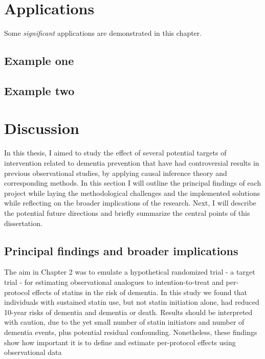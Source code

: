 \documentclass[
]{book}
\begin{document}
\hypertarget{chapter4}{%
\chapter{Applications}\label{chapter4}}

Some \emph{significant} applications are demonstrated in this chapter.

\hypertarget{example-one}{%
\section{Example one}\label{example-one}}

\hypertarget{example-two}{%
\section{Example two}\label{example-two}}

\hypertarget{discussion-1}{%
\chapter{Discussion}\label{discussion-1}}

In this thesis, I aimed to study the effect of several potential targets of intervention related to dementia prevention that have had controversial results in previous observational studies, by applying causal inference theory and corresponding methods. In this section I will outline the principal findings of each project while laying the methodological challenges and the implemented solutions while reflecting on the broader implications of the research. Next, I will describe the potential future directions and briefly summarize the central points of this dissertation.

\hypertarget{principal-findings-and-broader-implications}{%
\section{Principal findings and broader implications}\label{principal-findings-and-broader-implications}}

The aim in Chapter 2 was to emulate a hypothetical randomized trial - a target trial - for estimating observational analogues to intention-to-treat and per-protocol effects of statins in the risk of dementia. In this study we found that individuals with sustained statin use, but not statin initiation alone, had reduced 10-year risks of dementia and dementia or death. Results should be interpreted with caution, due to the yet small number of statin initiators and number of dementia events, plus potential residual confounding. Nonetheless, these findings show how important it is to define and estimate per-protocol effects using observational data
\end{document}
